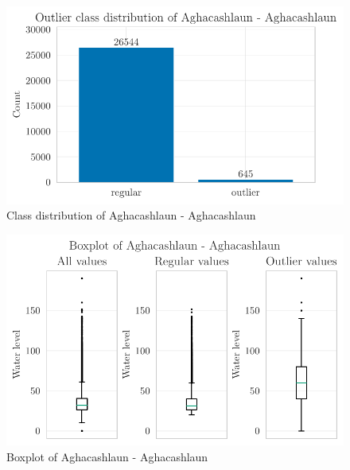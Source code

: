 \begin{figure}[htp]
    \centering
    \includegraphics{./plots/pdfs/36022-ie/outlier_class_distribution_36022-ie.pdf}
    \caption{Class distribution of Aghacashlaun - Aghacashlaun}
    \label{figure:class-distribution-36022-ie}
\end{figure}

\begin{figure}[htp]
    \centering
    \includegraphics{./plots/pdfs/36022-ie/boxplot_36022-ie.pdf}
    \caption{Boxplot of Aghacashlaun - Aghacashlaun}
    \label{figure:boxplot-36022-ie}
\end{figure}

